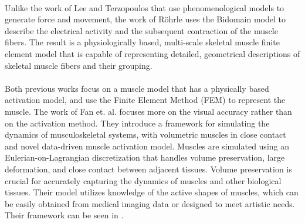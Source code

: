 
\paragraph{}Unlike the work of Lee and Terzopoulos that use phenomenological models to generate force and movement, the work of Röhrle \citep{rohrle2010simulating, rohrle2012physiologically} uses the Bidomain model to describe the electrical activity and the subsequent contraction of the muscle fibers. The result is a physiologically based, multi-scale skeletal muscle finite element model that is capable of representing detailed, geometrical descriptions of skeletal muscle fibers and their grouping.

\paragraph{}Both previous works focus on a muscle model that has a physically based activation model, and use the Finite Element Method (FEM) to represent the muscle. The work of Fan et. al. \citep{fan2014active} focuses more on the visual accuracy rather than on the activation method. They introduce a framework for simulating the dynamics of musculoskeletal systems, with volumetric muscles in close contact and novel data-driven muscle activation model. Muscles are simulated using an Eulerian-on-Lagrangian discretization that handles volume preservation, large deformation, and close contact between adjacent tissues. Volume preservation is crucial for accurately capturing the dynamics of muscles and other biological tissues. Their model utilizes knowledge of the active shapes of muscles, which can be easily obtained from medical imaging data or designed to meet artistic needs. Their framework can be seen in .


